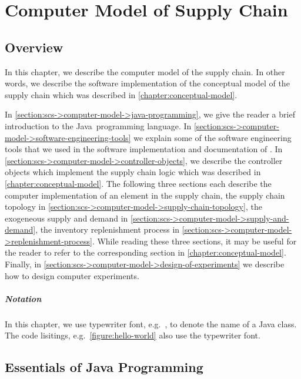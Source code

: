 \chapter[Computer Model (\scs)]{Computer Model of Supply Chain}
\label{chapter:implementation}

\section{Overview}

In this chapter,
we describe the computer model of the supply chain.
In other words,
we describe the software implementation
of the conceptual model of the supply chain
which was described in \autoref{chapter:conceptual-model}.


In \autoref{section:scs->computer-model->java-programming},
we give the reader a brief introduction
to the Java\texttrademark\  programming language.
In \autoref{section:scs->computer-model->software-engineering-tools}
we explain some of the software engineering tools
that we used in the software implementation and documentation of \scs.
In \autoref{section:scs->computer-model->controller-objects},
we describe the controller objects which implement the supply chain logic
which was described in \autoref{chapter:conceptual-model}.
The following three sections each describe
the computer implementation of an element in the supply chain,
the supply chain topology in
\autoref{section:scs->computer-model->supply-chain-topology},
the exogeneous supply and demand in 
\autoref{section:scs->computer-model->supply-and-demand},
the inventory replenishment process in
\autoref{section:scs->computer-model->replenishment-process}.
While reading these three sections,
it may be useful for the reader to refer to the
corresponding section in \autoref{chapter:conceptual-model}.
Finally, in \autoref{section:scs->computer-model->design-of-experiments}
we describe how to design computer experiments.

\paragraph{Notation}
In this chapter,
we use typewriter font, e.g.\ ,
to denote the name of a Java class.
The code lisitings, e.g.\ \autoref{figure:hello-world}
also use the typewriter font.





\section{Essentials of Java Programming}
\label{section:scs->computer-model->java-programming}


